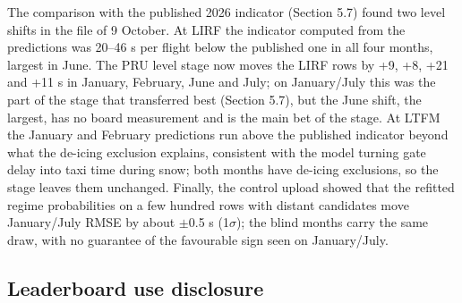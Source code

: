 \documentclass[
  manuscript=article,  %
  layout=preprint,     %
  year=2026,
  volume=4,
]{extra/joas}
\begin{document}
The comparison with the published 2026 indicator (Section 5.7) found two level shifts in the file of 9 October. At LIRF the indicator computed from the predictions was 20--46 s per flight below the published one in all four months, largest in June. The PRU level stage now moves the LIRF rows by +9, +8, +21 and +11 s in January, February, June and July; on January/July this was the part of the stage that transferred best (Section 5.7), but the June shift, the largest, has no board measurement and is the main bet of the stage. At LTFM the January and February predictions run above the published indicator beyond what the de-icing exclusion explains, consistent with the model turning gate delay into taxi time during snow; both months have de-icing exclusions, so the stage leaves them unchanged. Finally, the control upload showed that the refitted regime probabilities on a few hundred rows with distant candidates move January/July RMSE by about $\pm$0.5 s (1$\sigma$); the blind months carry the same draw, with no guarantee of the favourable sign seen on January/July.

\subsection{Leaderboard use disclosure}\label{leaderboard-use-disclosure}
\end{document}
